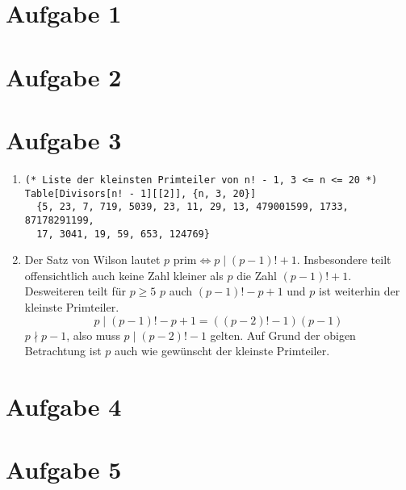 \section*{Aufgabe 1}

\section*{Aufgabe 2}

\section*{Aufgabe 3}
\begin{enumerate}[(1)]
\item 
\lstset{language=Mathematica}
\begin{lstlisting}
(* Liste der kleinsten Primteiler von n! - 1, 3 <= n <= 20 *)
Table[Divisors[n! - 1][[2]], {n, 3, 20}]
  {5, 23, 7, 719, 5039, 23, 11, 29, 13, 479001599, 1733, 87178291199,
  17, 3041, 19, 59, 653, 124769}
\end{lstlisting}
\item Der Satz von Wilson lautet $ p \text{ prim} \Leftrightarrow p \mid (p-1)! + 1 $.
Insbesondere teilt offensichtlich auch keine Zahl kleiner als $p$ die Zahl $  (p-1)! + 1 $. Desweiteren
teilt für $p \geq 5$ $p$ auch $ (p-1)! -  p + 1$  und $p$ ist weiterhin der kleinste Primteiler.
\[ p \mid (p-1)! - p + 1 = ((p-2)! - 1)(p-1) \]
$p \nmid p-1$, also muss $p \mid (p-2)! - 1 $ gelten. Auf Grund der obigen Betrachtung
ist $p$ auch wie gewünscht der kleinste Primteiler.
\end{enumerate}

\section*{Aufgabe 4}

\section*{Aufgabe 5}